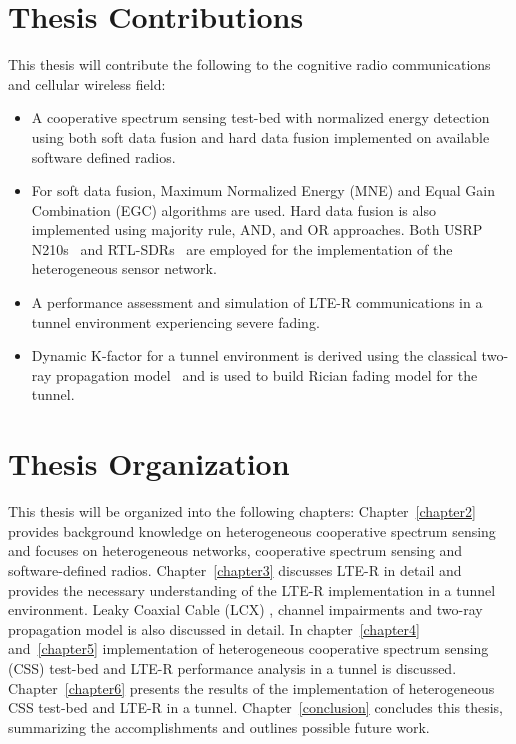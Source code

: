 \section{Thesis Contributions}

This thesis will contribute the following to the cognitive radio communications and cellular wireless field:

\begin{itemize}
\item A cooperative spectrum sensing test-bed with normalized energy detection using both soft data fusion and hard data fusion implemented on available software defined radios.

\item For soft data fusion, Maximum Normalized Energy (MNE) and Equal Gain Combination (EGC) algorithms are used. Hard data fusion is also implemented using majority rule, AND, and OR approaches. Both USRP N210s~\cite{usrp} and RTL-SDRs~\cite{rtlsdr} are employed for the implementation of the heterogeneous sensor network.

\item A performance assessment and simulation of LTE-R communications in a tunnel environment experiencing severe fading.

\item Dynamic K-factor for a tunnel environment is derived using the classical two-ray propagation model~\cite{booklter11} and is used to build Rician fading model for the tunnel.
\end{itemize}


\section{Thesis Organization}

This thesis will be organized into the following chapters:  
Chapter~\ref{chapter2} provides background knowledge on heterogeneous cooperative spectrum sensing and focuses on heterogeneous networks, cooperative spectrum sensing and software-defined radios. Chapter~\ref{chapter3} discusses LTE-R in detail and provides the necessary understanding of the LTE-R implementation in a tunnel environment. Leaky Coaxial Cable (LCX) , channel impairments and two-ray propagation model is also discussed in detail. In chapter~\ref{chapter4} and~\ref{chapter5} implementation of heterogeneous cooperative spectrum sensing (CSS) test-bed and LTE-R performance analysis in a tunnel is discussed. Chapter~\ref{chapter6} presents the results of the implementation of heterogeneous CSS test-bed and LTE-R in a tunnel. Chapter~\ref{conclusion} concludes this thesis, summarizing the accomplishments and outlines possible future work.



